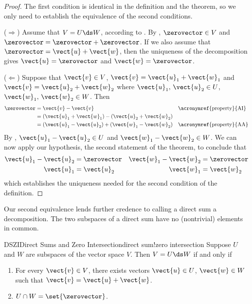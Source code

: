 \begin{proof}
The first condition is identical in the definition and the theorem, so we only need to establish the equivalence of the second conditions.\par
%
($\Rightarrow$)
Assume that $V=U\ds W$, according to .   By , $\zerovector\in V$ and $\zerovector=\zerovector+\zerovector$.  If we also assume that $\zerovector=\vect{u}+\vect{w}$, then the uniqueness of the decomposition gives $\vect{u}=\zerovector$ and $\vect{w}=\zerovector$.\par
%
($\Leftarrow$)
Suppose that $\vect{v}\in V$, $\vect{v}=\vect{u}_1+\vect{w}_1$ and $\vect{v}=\vect{u}_2+\vect{w}_2$ where $\vect{u}_1,\,\vect{u}_2\in U$, $\vect{w}_1,\,\vect{w}_2\in W$.  Then
%
\begin{align*}
\zerovector
&=\vect{v}-\vect{v}&&\text{\acronymref{property}{AI}}\\
&=\left(\vect{u}_1+\vect{w}_1\right)-\left(\vect{u}_2+\vect{w}_2\right)\\
&=\left(\vect{u}_1-\vect{u}_2\right)+\left(\vect{w}_1-\vect{w}_2\right)&&\text{\acronymref{property}{AA}}
\end{align*}
%
By , $\vect{u}_1-\vect{u}_2\in U$ and $\vect{w}_1-\vect{w}_2\in W$.  We can now apply our hypothesis, the second statement of the theorem, to conclude that
%
\begin{align*}
\vect{u}_1-\vect{u}_2&=\zerovector & \vect{w}_1-\vect{w}_2&=\zerovector\\
\vect{u}_1&=\vect{u}_2 & \vect{w}_1&=\vect{w}_2\\
\end{align*}
%
which establishes the uniqueness needed for the second condition of the definition.
%
\end{proof}
%
Our second equivalence lends further credence to calling a direct sum a decomposition.  The two subspaces of a direct sum have no (nontrivial) elements in common.
%
\begin{theorem}{DSZI}{Direct Sums and Zero Intersection}{direct sum!zero intersection}
Suppose $U$ and $W$ are subspaces of the vector space $V$.  Then $V=U\ds W$ if and only if
\begin{enumerate}
\item  For every $\vect{v}\in V$, there exists vectors $\vect{u}\in U$, $\vect{w}\in W$ such that $\vect{v}=\vect{u}+\vect{w}$.
%
\item $U\cap W=\set{\zerovector}$.
\end{enumerate}
\end{theorem}
